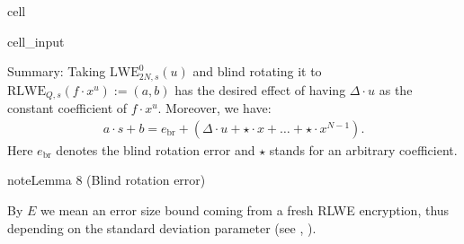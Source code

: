 \documentclass[letterpaper,10pt,english]{jupyterBook}
\begin{document}
\begin{sphinxuseclass}{cell}
\begin{sphinxVerbatimInput}
\begin{sphinxuseclass}{cell_input}
\begin{sphinxVerbatim}[commandchars=\\\{\}]
          \PYG{p}{[}\PYG{p}{]}\PYG{p}{[}\PYG{p}{]}  
          \PYG{p}{[}\PYG{p}{]}\PYG{p}{[}\PYG{p}{]}  
              
             
     
\end{sphinxVerbatim}

\end{sphinxuseclass}\end{sphinxVerbatimInput}

\end{sphinxuseclass}
\sphinxAtStartPar
Summary:
Taking \(\mathrm{LWE}_{2N,s}^0(u)\) and blind rotating it to \(\mathrm{RLWE}_{Q,s}(f \cdot x^u) := (a,b)\) has the desired effect of having \(\Delta \cdot u\) as the constant coefficient of \(f \cdot x^u\).
Moreover, we have:
\begin{equation}\label{equation:Thesis:blind-rotation-decryption}
\begin{split}a\cdot s+b = e_{\text{br}} + (\Delta \cdot u + \star \cdot x + \dots + \star \cdot x^{N-1}).\end{split}
\end{equation}
\sphinxAtStartPar
Here \(e_{\text{br}}\) denotes the blind rotation error and \(\star\) stands for an arbitrary coefficient.

\begin{DUlineblock}{0em}
\item[] 
\end{DUlineblock}
\label{Thesis:blind-rotation-error}
\begin{sphinxadmonition}{note}{Lemma 8 (Blind rotation error)}
\end{sphinxadmonition}

\sphinxAtStartPar
By \(E\) we mean an error size bound coming from a fresh RLWE encryption, thus depending on the standard deviation parameter (see {\hyperref[\detokenize{Thesis:error-after-BFV-encryption}]{}}, {\hyperref[\detokenize{Thesis:sampling-bound}]{}}).
\end{document}
